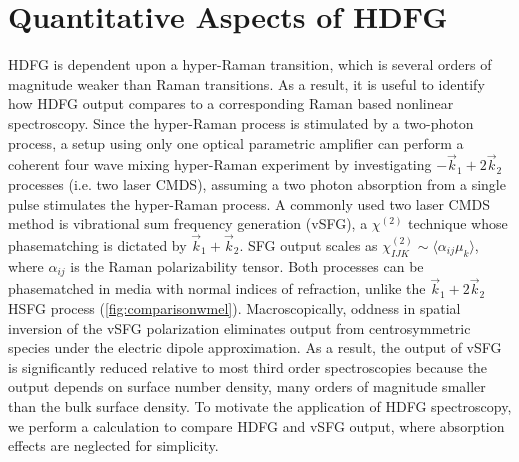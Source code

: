 \documentclass[aip, jcp, reprint, onecolumn]{revtex4-2}
\begin{document}
\section{Quantitative Aspects of HDFG}\label{quant}
HDFG is dependent upon a hyper-Raman transition, which is several orders of magnitude weaker than Raman transitions.\cite{RN515}
As a result, it is useful to identify how HDFG output compares to a corresponding Raman based nonlinear spectroscopy.
Since the hyper-Raman process is stimulated by a two-photon process, a setup using only one optical parametric amplifier can perform a coherent four wave mixing hyper-Raman experiment by investigating $-\vec{k}_1 + 2\vec{k}_2$ processes (i.e. two laser CMDS), assuming a two photon absorption from a single pulse stimulates the hyper-Raman process.
A commonly used two laser CMDS method is vibrational sum frequency generation (vSFG), a $\chi^{(2)}$ technique whose phasematching is dictated by $\vec{k}_1 + \vec{k}_2$.
SFG output scales as $\chi^{(2)}_{IJK} \sim \langle \alpha_{ij} \mu_k \rangle$, where $\alpha_{ij}$ is the Raman polarizability tensor.
Both processes can be phasematched in media with normal indices of refraction, unlike the $\vec{k}_1 + 2\vec{k}_2$ HSFG process (\autoref{fig:comparisonwmel}).\cite{RN120}
Macroscopically, oddness in spatial inversion of the vSFG polarization eliminates output from centrosymmetric species under the electric dipole approximation.\cite{RN132, RN133}
As a result, the output of vSFG is significantly reduced relative to most third order spectroscopies because the output depends on surface number density, many orders of magnitude smaller than the bulk surface density. 
To motivate the application of HDFG spectroscopy, we perform a calculation to compare HDFG and vSFG output, where absorption effects are neglected for simplicity.
\end{document}
